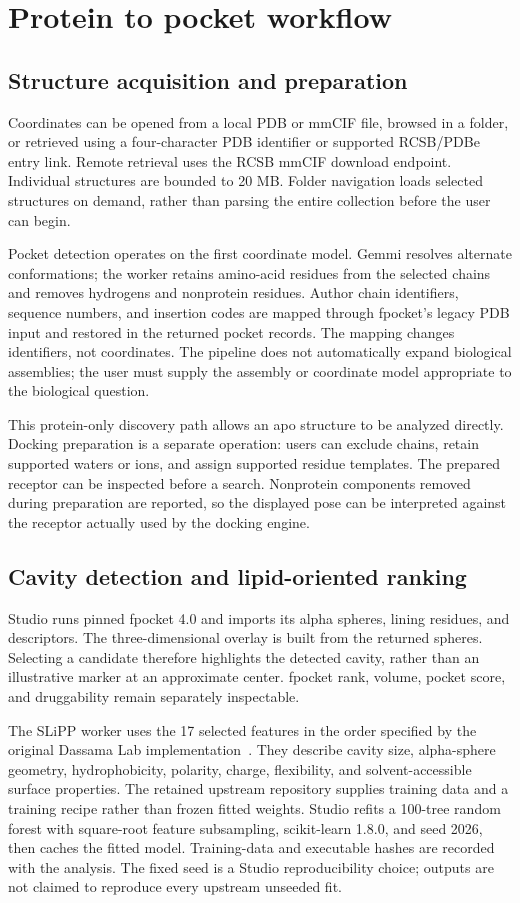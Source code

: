 \documentclass[10pt,a4paper]{article}
\begin{document}
\section{Protein to pocket workflow}
\subsection{Structure acquisition and preparation}
Coordinates can be opened from a local PDB or mmCIF file, browsed in a folder, or retrieved using a four-character PDB identifier or supported RCSB/PDBe entry link. Remote retrieval uses the RCSB mmCIF download endpoint. Individual structures are bounded to 20 MB. Folder navigation loads selected structures on demand, rather than parsing the entire collection before the user can begin.

Pocket detection operates on the first coordinate model. Gemmi resolves alternate conformations; the worker retains amino-acid residues from the selected chains and removes hydrogens and nonprotein residues. Author chain identifiers, sequence numbers, and insertion codes are mapped through fpocket's legacy PDB input and restored in the returned pocket records. The mapping changes identifiers, not coordinates. The pipeline does not automatically expand biological assemblies; the user must supply the assembly or coordinate model appropriate to the biological question.

This protein-only discovery path allows an apo structure to be analyzed directly. Docking preparation is a separate operation: users can exclude chains, retain supported waters or ions, and assign supported residue templates. The prepared receptor can be inspected before a search. Nonprotein components removed during preparation are reported, so the displayed pose can be interpreted against the receptor actually used by the docking engine.

\subsection{Cavity detection and lipid-oriented ranking}
Studio runs pinned fpocket 4.0 and imports its alpha spheres, lining residues, and descriptors. The three-dimensional overlay is built from the returned spheres. Selecting a candidate therefore highlights the detected cavity, rather than an illustrative marker at an approximate center. fpocket rank, volume, pocket score, and druggability remain separately inspectable.

The SLiPP worker uses the 17 selected features in the order specified by the original Dassama Lab implementation~\cite{slippcode}. They describe cavity size, alpha-sphere geometry, hydrophobicity, polarity, charge, flexibility, and solvent-accessible surface properties. The retained upstream repository supplies training data and a training recipe rather than frozen fitted weights. Studio refits a 100-tree random forest with square-root feature subsampling, scikit-learn 1.8.0, and seed 2026, then caches the fitted model. Training-data and executable hashes are recorded with the analysis. The fixed seed is a Studio reproducibility choice; outputs are not claimed to reproduce every upstream unseeded fit.
\end{document}
